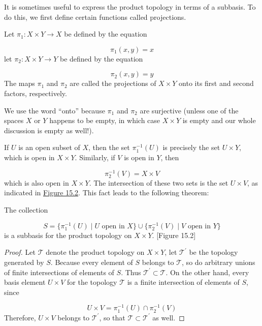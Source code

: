 It is sometimes useful to express the product topology in terms of a subbasis. To do this, we first define certain functions called projections.

\begin{definition}
 Let \({\pi }_{1} : X \times Y \rightarrow X\) be defined by the equation

 \[
 {\pi }_{1}( {x,y}) = x
 \]
 let \({\pi }_{2} : X \times Y \rightarrow Y\) be defined by the equation

 \[
 {\pi }_{2}( {x,y}) = y
 \]
 The maps \({\pi }_{1}\) and \({\pi }_{2}\) are called the projections of \(X \times Y\) onto its first and second factors, respectively.
\end{definition}

We use the word ``onto'' because \({\pi }_{1}\) and \({\pi }_{2}\) are surjective (unless one of the spaces \(X\) or \(Y\) happens to be empty, in which case \(X \times Y\) is empty and our whole discussion is empty as well!).

If \(U\) is an open subset of \(X\), then the set \({\pi }_1^{-1}( U)\) is precisely the set \(U \times Y\), which is open in \(X \times Y\). Similarly, if \(V\) is open in \(Y\), then

\[
{\pi }_2^{-1}( V) = X \times V
\]
which is also open in \(X \times Y\). The intersection of these two sets is the set \(U \times V\), as indicated in \hyperref[fig:15.2]{Figure 15.2}. This fact leads to the following theorem:

\begin{theorem}
\label{thm:\thetheorem}
 The collection

 \[
 S = \{ {{\pi }_1^{-1}( U) \mid U\text{ open in }X}\} \cup \{ {{\pi }_2^{-1}( V) \mid V\text{ open in }Y}\}
 \]
 is a subbasis for the product topology on \(X \times Y\).
 [Figure 15.2]
\end{theorem}

\begin{proof}
 Let \(\mathcal{T}\) denote the product topology on \(X \times Y\), let \(\mathcal{T}^{\prime }\) be the topology generated by \(S\). Because every element of \(S\) belongs to \(\mathcal{T}\), so do arbitrary unions of finite intersections of elements of \(S\). Thus \(\mathcal{T}^{\prime } \subset \mathcal{T}\). On the other hand, every basis element \(U \times V\) for the topology \(\mathcal{T}\) is a finite intersection of elements of \(S\), since

 \[
 U \times V = {\pi }_1^{-1}( U) \cap {\pi }_2^{-1}( V)
 \]
 Therefore, \(U \times V\) belongs to \(\mathcal{T}^{\prime }\), so that \(\mathcal{T} \subset {\mathcal{T}}^{\prime }\) as well.
\end{proof}

